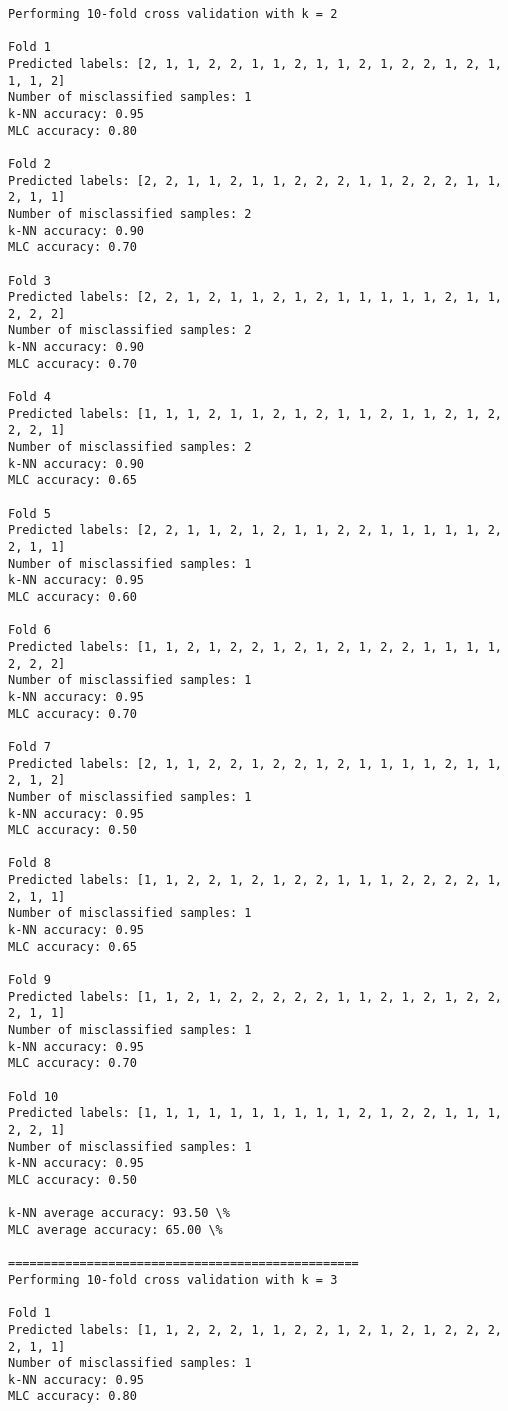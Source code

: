 \documentclass[11pt]{article}
\begin{document}
    \begin{Verbatim}[commandchars=\\\{\}]
Performing 10-fold cross validation with k = 2

Fold 1
Predicted labels: [2, 1, 1, 2, 2, 1, 1, 2, 1, 1, 2, 1, 2, 2, 1, 2, 1, 1, 1, 2]
Number of misclassified samples: 1
k-NN accuracy: 0.95
MLC accuracy: 0.80

Fold 2
Predicted labels: [2, 2, 1, 1, 2, 1, 1, 2, 2, 2, 1, 1, 2, 2, 2, 1, 1, 2, 1, 1]
Number of misclassified samples: 2
k-NN accuracy: 0.90
MLC accuracy: 0.70

Fold 3
Predicted labels: [2, 2, 1, 2, 1, 1, 2, 1, 2, 1, 1, 1, 1, 1, 2, 1, 1, 2, 2, 2]
Number of misclassified samples: 2
k-NN accuracy: 0.90
MLC accuracy: 0.70

Fold 4
Predicted labels: [1, 1, 1, 2, 1, 1, 2, 1, 2, 1, 1, 2, 1, 1, 2, 1, 2, 2, 2, 1]
Number of misclassified samples: 2
k-NN accuracy: 0.90
MLC accuracy: 0.65

Fold 5
Predicted labels: [2, 2, 1, 1, 2, 1, 2, 1, 1, 2, 2, 1, 1, 1, 1, 1, 2, 2, 1, 1]
Number of misclassified samples: 1
k-NN accuracy: 0.95
MLC accuracy: 0.60

Fold 6
Predicted labels: [1, 1, 2, 1, 2, 2, 1, 2, 1, 2, 1, 2, 2, 1, 1, 1, 1, 2, 2, 2]
Number of misclassified samples: 1
k-NN accuracy: 0.95
MLC accuracy: 0.70

Fold 7
Predicted labels: [2, 1, 1, 2, 2, 1, 2, 2, 1, 2, 1, 1, 1, 1, 2, 1, 1, 2, 1, 2]
Number of misclassified samples: 1
k-NN accuracy: 0.95
MLC accuracy: 0.50

Fold 8
Predicted labels: [1, 1, 2, 2, 1, 2, 1, 2, 2, 1, 1, 1, 2, 2, 2, 2, 1, 2, 1, 1]
Number of misclassified samples: 1
k-NN accuracy: 0.95
MLC accuracy: 0.65

Fold 9
Predicted labels: [1, 1, 2, 1, 2, 2, 2, 2, 2, 1, 1, 2, 1, 2, 1, 2, 2, 2, 1, 1]
Number of misclassified samples: 1
k-NN accuracy: 0.95
MLC accuracy: 0.70

Fold 10
Predicted labels: [1, 1, 1, 1, 1, 1, 1, 1, 1, 1, 2, 1, 2, 2, 1, 1, 1, 2, 2, 1]
Number of misclassified samples: 1
k-NN accuracy: 0.95
MLC accuracy: 0.50

k-NN average accuracy: 93.50 \%
MLC average accuracy: 65.00 \%

=================================================
Performing 10-fold cross validation with k = 3

Fold 1
Predicted labels: [1, 1, 2, 2, 2, 1, 1, 2, 2, 1, 2, 1, 2, 1, 2, 2, 2, 2, 1, 1]
Number of misclassified samples: 1
k-NN accuracy: 0.95
MLC accuracy: 0.80


\end{Verbatim}
\end{document}
